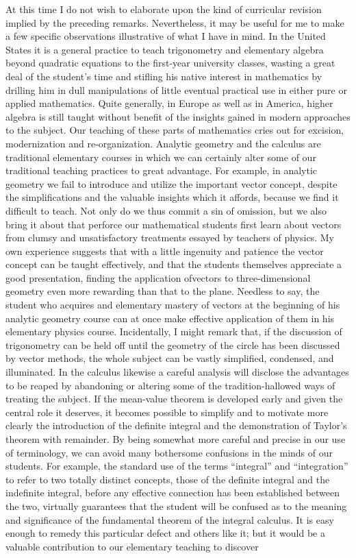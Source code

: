 \newpage

At this time I do not wish to elaborate upon the kind of curricular revision implied by the preceding remarks. Nevertheless, it may be useful for me to make a few specific observations illustrative of what I have in mind. In the United States it is a general practice to teach trigonometry and elementary algebra beyond quadratic equations to the first-year university classes, wasting a great deal of the student's time and stifling his native interest in mathematics by drilling him in dull manipulations of little eventual practical use in either pure or applied mathematics. Quite generally, in Europe as well as in America, higher algebra is still taught without benefit of the insights gained in modern approaches to the subject. Our teaching of these parts of mathematics cries out for excision, modernization and re-organization. Analytic geometry and the calculus are traditional elementary courses in which we can certainly alter some of our traditional teaching practices to great advantage. For example, in analytic geometry we fail to introduce and utilize the important vector concept, despite the simplifications and the valuable insights which it affords, because we find it difficult to teach. Not only do we thus commit a sin of omission, but we also bring it about that perforce our mathematical students first learn about vectors from clumsy and unsatisfactory treatments essayed by teachers of physics. My own experience suggests that with a little ingenuity and patience the vector concept can be taught effectively, and that the students themselves appreciate a good presentation, finding the application of\pageoriginale vectors to three-dimensional geometry even more rewarding than that to the plane. Needless to say, the student who acquires and elementary mastery of vectors at the beginning of his analytic geometry course can at once make effective application of them in his elementary physics course. Incidentally, I might remark that, if the discussion of trigonometry can be held off until the geometry of the circle has been discussed by vector methods, the whole subject can be vastly simplified, condensed, and illuminated. In the calculus likewise a careful analysis will disclose the advantages to be reaped by abandoning or altering some of the tradition-hallowed ways of treating the subject. If the mean-value theorem is developed early and given the central role it deserves, it becomes possible to simplify and to motivate more clearly the introduction of the definite integral and the demonstration of Taylor's theorem with remainder. By being somewhat more careful and precise in our use of terminology, we can avoid many bothersome confusions in the minds of our students. For example, the standard use of the terms ``integral'' and ``integration'' to refer to two totally distinct concepts, those of the definite integral and the indefinite integral, before any effective connection has been established between the two, virtually guarantees that the student will be confused as to the meaning and significance of the fundamental theorem of the integral calculus. It is easy enough to remedy this particular defect and others like it; but it would be a valuable contribution to our elementary teaching to discover 